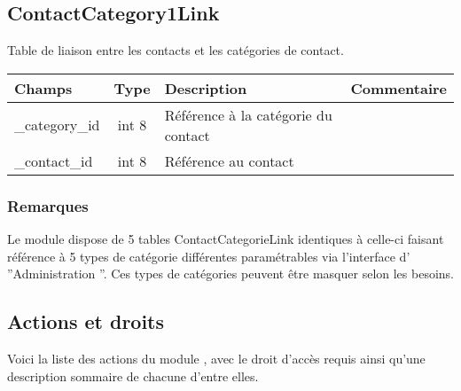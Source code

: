 \subsection{ContactCategory1Link}
Table de liaison entre les contacts et les catégories de contact.\\

\begin{tabular}{|p{3cm}|c|p{5.4cm}|p{2.6cm}|}
\hline
\textbf{Champs} & \textbf{Type} & \textbf{Description} & \textbf{Commentaire} \\
\hline
\_category\_id & int 8 & Référence à la catégorie du contact & \\
\hline
\_contact\_id & int 8 & Référence au contact & \\
\hline
\end{tabular}


\subsubsection{Remarques}

Le module \contact dispose de 5 tables ContactCategorieLink identiques à celle-ci faisant référence à 5 types de catégorie différentes paramétrables via l'interface d' ''Administration ''. Ces types de catégories peuvent être masquer selon les besoins.\\  

\subsection{Actions et droits}

Voici la liste des actions du module \contact, avec le droit d'accès requis ainsi qu'une description sommaire de chacune d'entre elles.\\

